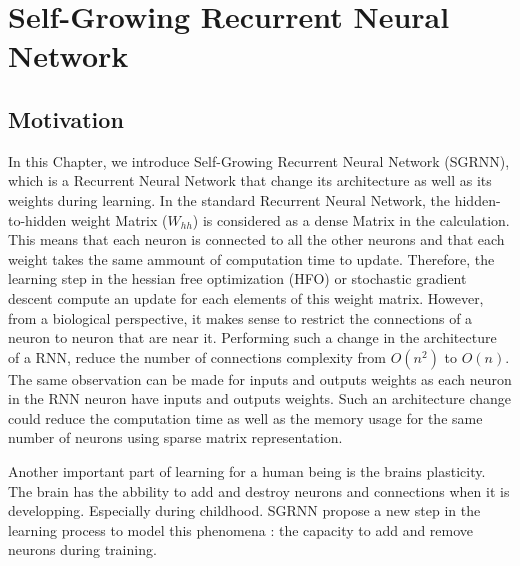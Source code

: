 
\chapter{ Self-Growing Recurrent Neural Network} %

\label{Chapter 2} %




\section{Motivation}

In this Chapter, we introduce Self-Growing Recurrent Neural Network (SGRNN), which is a Recurrent Neural Network that change its architecture as well as its weights during learning. In the standard Recurrent Neural Network, the hidden-to-hidden weight Matrix ($W_{hh}$) is considered as a dense Matrix in the calculation. This means that each neuron is connected to all the other neurons and that each weight takes the same ammount of computation time to update. Therefore, the learning step in the hessian free optimization (HFO) or stochastic gradient descent compute an update for each elements of this weight matrix. However, from a biological perspective, it makes sense to restrict the connections of a neuron to neuron that are near it. Performing such a change in the architecture of a RNN, reduce the number of connections complexity from $O(n^2)$ to $O(n)$. The same observation can be made for inputs and outputs weights as each neuron in the RNN neuron have inputs and outputs weights. Such an architecture change could reduce the computation time as well as the memory usage for the same number of neurons using sparse matrix representation. 

Another important part of learning for a human being is the brains plasticity. The brain has the abbility to add and destroy neurons and connections when it is developping. Especially during childhood. SGRNN propose a new step in the learning process to model this phenomena : the capacity to add and remove neurons during training.

